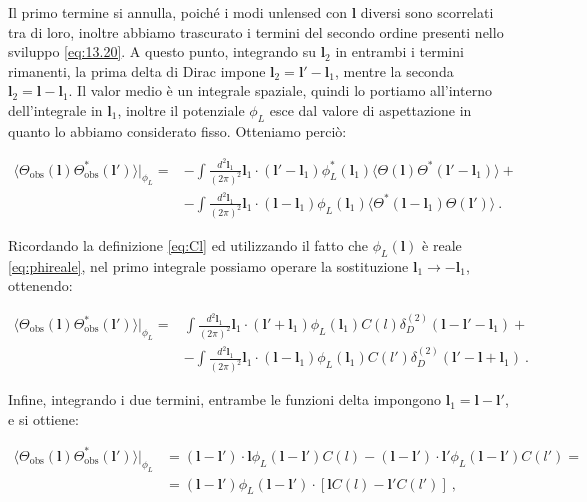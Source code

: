 \documentclass[a4paper,10pt]{article}
\newcommand{\B}{\boldsymbol}
\begin{document}
Il primo termine si annulla, poiché i modi unlensed con $\B l$ diversi sono scorrelati tra di loro, inoltre abbiamo trascurato i termini del secondo ordine presenti nello sviluppo \eqref{eq:13.20}. 
A questo punto, integrando su $\B l_2$ in entrambi i termini rimanenti, la prima delta di Dirac impone $\B l_2 = \B l' - \B l_1$, mentre la seconda $\B l_2 = \B l - \B l_1$.
Il valor medio è un integrale spaziale, quindi lo portiamo all'interno dell'integrale in $\B l_1$, inoltre il potenziale $\phi_L$ esce dal valore di aspettazione in quanto lo abbiamo considerato fisso.
Otteniamo perciò:

\begin{equation}
\begin{aligned}
    \langle \Theta_{\text{obs}}(\boldsymbol{l}) \Theta_{\text{obs}}^*(\boldsymbol{l}') \rangle \Big|_{\phi_L} =& - \int \frac{d^2 \B l_1}{(2\pi)^2} \boldsymbol{l}_1 \cdot (\B l' - \B l_1) \phi_L^*(\boldsymbol{l}_1) \langle \Theta(\B l) \Theta^*(\B l' - \B l_1) \rangle + \\
    & - \int \frac{d^2 \B l_1}{(2\pi)^2} \boldsymbol{l}_1 \cdot (\B l - \B l_1) \phi_L(\boldsymbol{l}_1) \langle \Theta^*(\B l - \B l_1) \Theta(\B l') \rangle \ .
\end{aligned}
\end{equation}

Ricordando la definizione \eqref{eq:Cl} ed utilizzando il fatto che $\phi_L(\B l)$ è reale \eqref{eq:phireale}, nel primo integrale possiamo operare la sostituzione $\B l_1 \to -\B l_1$, ottenendo:

\begin{equation}
\begin{aligned}
    \langle \Theta_{\text{obs}}(\boldsymbol{l}) \Theta_{\text{obs}}^*(\boldsymbol{l}') \rangle \Big|_{\phi_L} =& \int \frac{d^2 \B l_1}{(2\pi)^2} \boldsymbol{l}_1 \cdot (\B l' + \B l_1) \phi_L(\boldsymbol{l}_1) C(l) \delta_D^{(2)}(\B l - \B l' - \B l_1) + \\
    & - \int \frac{d^2 \B l_1}{(2\pi)^2} \boldsymbol{l}_1 \cdot (\B l - \B l_1) \phi_L(\boldsymbol{l}_1) C(l') \delta_D^{(2)}(\B l' - \B l + \B l_1) \ .
\end{aligned}
\end{equation}

Infine, integrando i due termini, entrambe le funzioni delta impongono $\B l_1 = \B l - \B l'$, e si ottiene:

\begin{equation}
\begin{aligned}
    \langle \Theta_{\text{obs}}(\boldsymbol{l}) \Theta_{\text{obs}}^*(\boldsymbol{l}') \rangle \Big|_{\phi_L}& = (\B l - \B l') \cdot \B l \phi_L(\B l - \B l') C(l) - (\B l - \B l') \cdot \B l' \phi_L(\B l - \B l') C(l') = \\
        & = (\B l - \B l') \phi_L(\B l - \B l') \cdot [\B l C(l) - \B l' C(l')] \ ,
\end{aligned}
\end{equation}
\end{document}
